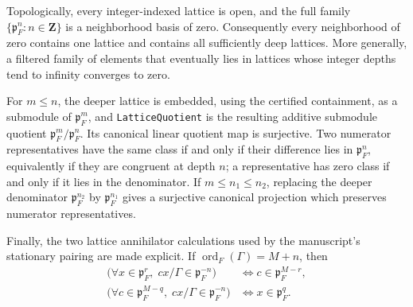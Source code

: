 \begin{definition}
Topologically, every integer-indexed lattice is open, and the full family
$\{\mathfrak p_F^n:n\in\mathbf Z\}$ is a neighborhood basis of zero.
Consequently every neighborhood of zero contains one lattice and contains
all sufficiently deep lattices.  More generally, a filtered family of
elements that eventually lies in lattices whose integer depths tend to
infinity converges to zero.

For $m\leq n$, the deeper lattice is embedded, using the certified
containment, as a submodule of $\mathfrak p_F^m$, and
\texttt{LatticeQuotient} is the resulting additive submodule quotient
$\mathfrak p_F^m/\mathfrak p_F^n$.  Its canonical linear quotient map is
surjective.  Two numerator representatives have the same class if and only
if their difference lies in $\mathfrak p_F^n$, equivalently if they are
congruent at depth $n$; a representative has zero class if and only if it
lies in the denominator.  If $m\leq n_1\leq n_2$, replacing the deeper
denominator $\mathfrak p_F^{n_2}$ by $\mathfrak p_F^{n_1}$ gives a
surjective canonical projection which preserves numerator representatives.

Finally, the two lattice annihilator calculations used by the manuscript's
stationary pairing are made explicit.  If
$\operatorname{ord}_F(\Gamma)=M+n$, then
\[
 \begin{aligned}
  \bigl(\forall x\in\mathfrak p_F^r,
     \;cx/\Gamma\in\mathfrak p_F^{-n}\bigr)
    &\iff c\in\mathfrak p_F^{M-r},\\
  \bigl(\forall c\in\mathfrak p_F^{M-q},
     \;cx/\Gamma\in\mathfrak p_F^{-n}\bigr)
    &\iff x\in\mathfrak p_F^q.
 \end{aligned}
\]
\leanok
{}
\FormalizationContract
\end{definition}
